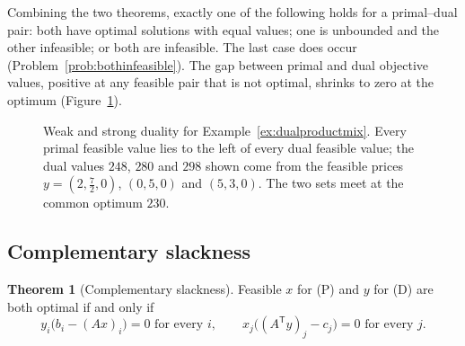 \documentclass[11pt,a4paper]{article}
\numberwithin{equation}{section}
\theoremstyle{definition}
\newtheorem{thm}{Theorem}[subsection]
\begin{document}
Combining the two theorems, exactly one of the following holds for a primal--dual pair: both have optimal solutions with equal values; one is unbounded and the other infeasible; or both are infeasible. The last case does occur (Problem~\ref{prob:bothinfeasible}). The gap between
primal and dual objective values, positive at any feasible pair that is not optimal, shrinks to zero at the optimum (Figure~\ref{fig:duality}).

\begin{figure}[H]
\centering
{}
\caption{Weak and strong duality for Example~\ref{ex:dualproductmix}. Every primal feasible value lies to the left of every dual feasible value; the dual values $248$, $280$ and $298$ shown come from the feasible prices $y = (2, \frac72, 0)$, $(0, 5, 0)$ and $(5, 3, 0)$. The two sets meet at the common optimum $230$.}
\label{fig:duality}
\end{figure}

\subsection{Complementary slackness}
\label{ssec:compslack}

\begin{thm}[Complementary slackness]
\label{thm:compslack}
Feasible $x$ for (P) and $y$ for (D) are both optimal if and only if
\[
y_i\bigl(b_i - (Ax)_i\bigr) = 0 \text{ for every } i, \qquad x_j\bigl((A^{\mathsf T}y)_j - c_j\bigr) = 0 \text{ for every } j .
\]
\end{thm}
\end{document}
